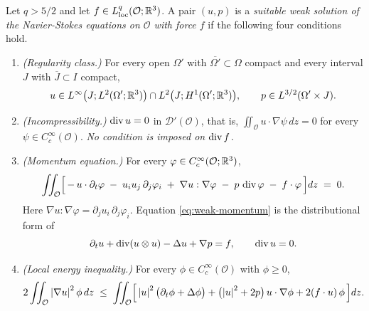 \documentclass[11pt,reqno]{amsart}
\begin{document}
\begin{definition}\label{def:sws}
Let $q>5/2$ and let $f\in L^{q}_{\mathrm{loc}}(\mathcal{O};\mathbb{R}^{3})$. A pair
$(u,p)$ is a \emph{suitable weak solution of the Navier-Stokes equations on
$\mathcal{O}$ with force $f$} if the following four conditions hold.
\begin{enumerate}
\item[(S1)] \emph{(Regularity class.)} For every open $\Omega'$ with
  $\overline{\Omega'}\subset\Omega$ compact and every interval $J$ with
  $\overline{J}\subset I$ compact,
  \[
    u\in L^{\infty}\bigl(J;L^{2}(\Omega';\mathbb{R}^{3})\bigr)
        \cap L^{2}\bigl(J;H^{1}(\Omega';\mathbb{R}^{3})\bigr),
    \qquad
    p\in L^{3/2}(\Omega'\times J).
  \]
\item[(S2)] \emph{(Incompressibility.)} $\operatorname{div} u=0$ in
  $\mathcal{D}'(\mathcal{O})$, that is,
  $\iint_{\mathcal{O}}u\cdot\nabla\psi\,dz=0$ for every
  $\psi\in C_{c}^{\infty}(\mathcal{O})$. \emph{No condition is imposed on
  $\operatorname{div} f$.}
\item[(S3)] \emph{(Momentum equation.)} For every
  $\varphi\in C^{\infty}_{c}(\mathcal{O};\mathbb{R}^{3})$,
  \begin{equation}\label{eq:weak-momentum}
    \iint_{\mathcal{O}}
      \Bigl[\,-\,u\cdot\partial_{t}\varphi
        \;-\;u_{i}u_{j}\,\partial_{j}\varphi_{i}
        \;+\;\nabla u:\nabla\varphi
        \;-\;p\,\operatorname{div}\varphi
        \;-\;f\cdot\varphi\,\Bigr]dz \;=\;0 .
  \end{equation}
  Here $\nabla u:\nabla\varphi=\partial_{j}u_{i}\,\partial_{j}\varphi_{i}$.
  Equation \eqref{eq:weak-momentum} is the distributional form of
  \begin{equation}\label{eq:NS}
    \partial_{t}u+\operatorname{div}(u\otimes u)-\Delta u+\nabla p=f,
    \qquad \operatorname{div} u=0 .
  \end{equation}
\item[(S4)] \emph{(Local energy inequality.)} For every
  $\phi\in C_{c}^{\infty}(\mathcal{O})$ with $\phi\ge0$,
  \begin{equation}\label{eq:lei}
    2\iint_{\mathcal{O}}\left\lvert \nabla u \right\rvert^{2}\phi\,dz
    \;\le\;
    \iint_{\mathcal{O}}\Bigl[\,\left\lvert u \right\rvert^{2}\bigl(\partial_{t}\phi+\Delta\phi\bigr)
      +\bigl(\left\lvert u \right\rvert^{2}+2p\bigr)\,u\cdot\nabla\phi
      +2(f\cdot u)\,\phi\,\Bigr]dz .
  \end{equation}
\end{enumerate}
\end{definition}
\end{document}
